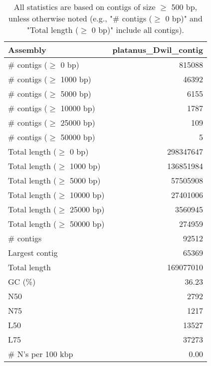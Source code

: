 \documentclass[12pt,a4paper]{article}
\begin{document}
\begin{table}[ht]
\begin{center}
\caption{All statistics are based on contigs of size $\geq$ 500 bp, unless otherwise noted (e.g., "\# contigs ($\geq$ 0 bp)" and "Total length ($\geq$ 0 bp)" include all contigs).}
\begin{tabular}{|l*{1}{|r}|}
\hline
Assembly & platanus\_Dwil\_contig \\ \hline
\# contigs ($\geq$ 0 bp) & 815088 \\ \hline
\# contigs ($\geq$ 1000 bp) & 46392 \\ \hline
\# contigs ($\geq$ 5000 bp) & 6155 \\ \hline
\# contigs ($\geq$ 10000 bp) & 1787 \\ \hline
\# contigs ($\geq$ 25000 bp) & 109 \\ \hline
\# contigs ($\geq$ 50000 bp) & 5 \\ \hline
Total length ($\geq$ 0 bp) & 298347647 \\ \hline
Total length ($\geq$ 1000 bp) & 136851984 \\ \hline
Total length ($\geq$ 5000 bp) & 57505908 \\ \hline
Total length ($\geq$ 10000 bp) & 27401006 \\ \hline
Total length ($\geq$ 25000 bp) & 3560945 \\ \hline
Total length ($\geq$ 50000 bp) & 274959 \\ \hline
\# contigs & 92512 \\ \hline
Largest contig & 65369 \\ \hline
Total length & 169077010 \\ \hline
GC (\%) & 36.23 \\ \hline
N50 & 2792 \\ \hline
N75 & 1217 \\ \hline
L50 & 13527 \\ \hline
L75 & 37273 \\ \hline
\# N's per 100 kbp & 0.00 \\ \hline
\end{tabular}
\end{center}
\end{table}
\end{document}
